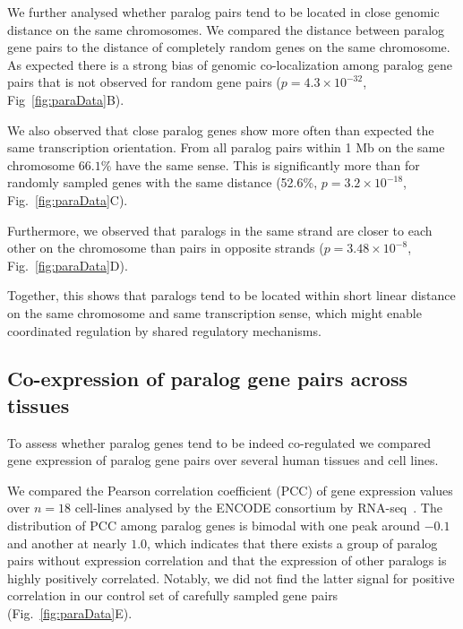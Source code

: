 \documentclass[a4paper,twoside=true,openright,parskip=full,chapterprefix=true,11pt,headings=normal,bibliography=totoc,listof=totoc,titlepage=on,captions=tableabove,draft=false]{scrreprt}
\theoremstyle{definition}
\theoremstyle{definition}
\theoremstyle{definition}
\theoremstyle{remark}
\begin{document}
We further analysed whether paralog pairs tend to be located in close
genomic distance on the same chromosomes. We compared the distance
between paralog gene pairs to the distance of completely random genes on
the same chromosome. As expected there is a strong bias of genomic
co-localization among paralog gene pairs that is not observed for random
gene pairs (\(p=4.3\times10^{-32}\), Fig~\ref{fig:paraData}B).

We also observed that close paralog genes show more often than expected
the same transcription orientation. From all paralog pairs within 1 Mb
on the same chromosome \(66.1\%\) have the same sense. This is
significantly more than for randomly sampled genes with the same
distance (52.6\%, \(p=3.2\times10^{-18}\), Fig.~\ref{fig:paraData}C).

Furthermore, we observed that paralogs in the same strand are closer to
each other on the chromosome than pairs in opposite strands
(\(p=3.48\times10^{-8}\), Fig.~\ref{fig:paraData}D).

Together, this shows that paralogs tend to be located within short
linear distance on the same chromosome and same transcription sense,
which might enable coordinated regulation by shared regulatory
mechanisms.

\hypertarget{co-expression-of-paralog-gene-pairs-across-tissues}{%
\subsection{Co-expression of paralog gene pairs across
tissues}\label{co-expression-of-paralog-gene-pairs-across-tissues}}

To assess whether paralog genes tend to be indeed co-regulated we
compared gene expression of paralog gene pairs over several human
tissues and cell lines.

We compared the Pearson correlation coefficient (PCC) of gene expression
values over \(n = 18\) cell-lines analysed by the ENCODE consortium by
RNA-seq~\citep{Djebali2012}. The distribution of PCC among paralog genes
is bimodal with one peak around \(-0.1\) and another at nearly \(1.0\),
which indicates that there exists a group of paralog pairs without
expression correlation and that the expression of other paralogs is
highly positively correlated. Notably, we did not find the latter signal
for positive correlation in our control set of carefully sampled gene
pairs (Fig.~\ref{fig:paraData}E).
\end{document}
